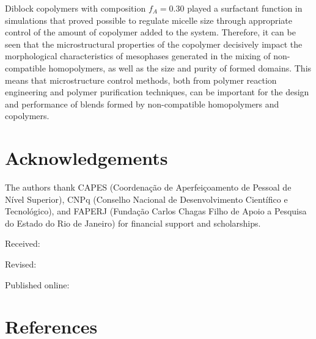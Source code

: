 \documentclass[
aip,
jcp,
reprint,
]{revtex4-1}
\begin{document}
Diblock copolymers with composition $f_A=0.30$ played a surfactant function in simulations that proved possible to regulate micelle size through appropriate control of the amount of copolymer added to the system.
Therefore, it can be seen that the microstructural properties of the copolymer decisively impact the morphological characteristics of mesophases generated in the mixing of non-compatible homopolymers, as well as the size and purity of formed domains.
This means that microstructure control methods, both from polymer reaction engineering and polymer purification techniques, can be important for the design and performance of blends formed by non-compatible homopolymers and copolymers. 

\section*{Acknowledgements}

The authors thank CAPES (Coordena\c{c}\~ao de Aperfei\c{c}oamento de Pessoal de N\'ivel Superior), CNPq (Conselho Nacional de Desenvolvimento Cient\'ifico e Tecnol\'ogico), and FAPERJ (Funda\c{c}\~ao Carlos Chagas Filho de Apoio a Pesquisa do Estado do Rio de Janeiro) for financial support and scholarships.

\begin{flushright}
Received:

Revised:

Published online:
\end{flushright}

\section*{References}



%
\end{document}
